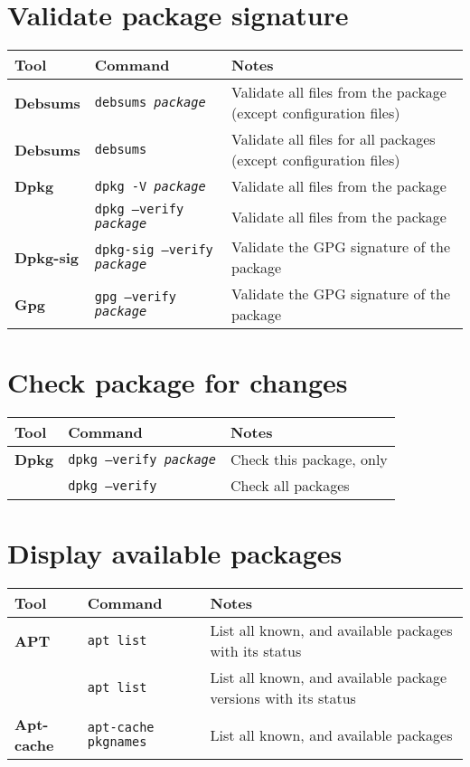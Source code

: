 \documentclass[10pt]{article}
\begin{document}
\section{Validate package signature}
\begin{tabular}{ p{3.5cm} p{9cm} p{11cm}}
  \hline
  \rowcolor{Gray}
  \textbf{Tool} & \textbf{Command} & \textbf{Notes} \\
  \hline 
  \textbf{Debsums} & \texttt{debsums \textit{package}} & Validate all files from the package (except configuration files)\\
  \rowcolor{Gray}
  \textbf{Debsums} & \texttt{debsums} & Validate all files for all packages (except configuration files) \\
  \textbf{Dpkg} & \texttt{dpkg -V \textit{package}} & Validate all files from the package \\
  \rowcolor{Gray}
  & \texttt{dpkg --verify \textit{package}} & Validate all files from the package \\
  \textbf{Dpkg-sig} & \texttt{dpkg-sig --verify \textit{package}} & Validate the GPG signature of the package \\
  \rowcolor{Gray}
  \textbf{Gpg} & \texttt{gpg --verify \textit{package}} & Validate the GPG signature of the package \\
  \hline
\end{tabular}

\section{Check package for changes}
\begin{tabular}{ p{3.5cm} p{9cm} p{11cm}}
  \hline
  \rowcolor{Gray}
  \textbf{Tool} & \textbf{Command} & \textbf{Notes} \\
  \hline 
  \textbf{Dpkg} & \texttt{dpkg --verify \textit{package}} & Check this package, only \\
  \rowcolor{Gray}
  & \texttt{dpkg --verify} & Check all packages \\
  \hline
\end{tabular}


\section{Display available packages}
\begin{tabular}{ p{3.5cm} p{9cm} p{11cm}}
  \hline
  \rowcolor{Gray}
  \textbf{Tool} & \textbf{Command} & \textbf{Notes} \\
  \hline 
  \textbf{APT} & \texttt{apt list} & List all known, and available packages with its status\\
  \rowcolor{Gray}
  & \texttt{apt list} & List all known, and available package versions with its status\\
  \textbf{Apt-cache} & \texttt{apt-cache pkgnames} & List all known, and available packages\\
  \hline
\end{tabular}
\end{document}
